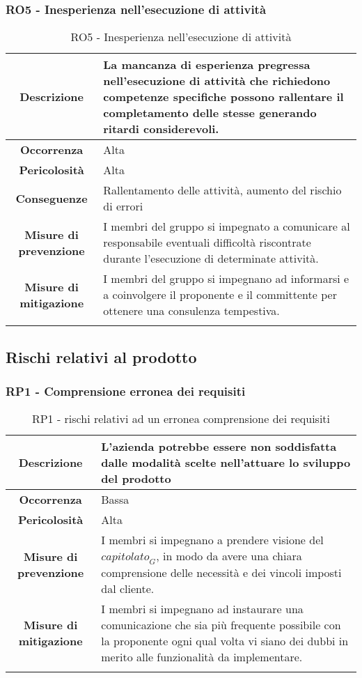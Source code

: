 %
%
\subsubsection[RO5]{RO5 - Inesperienza nell'esecuzione di attività}\label{ro:5}
\begin{longtable}{|c|p{12cm}|}
\hline
\textbf{Descrizione} & La mancanza di esperienza pregressa nell'esecuzione di attività che richiedono competenze specifiche possono rallentare il completamento delle stesse generando ritardi considerevoli. \\
\hline
\textbf{Occorrenza} & Alta \\
\hline
\textbf{Pericolosità} & Alta \\
\hline
\textbf{Conseguenze} & Rallentamento delle attività, aumento del rischio di errori \\
\hline
\textbf{Misure di prevenzione} & I membri del gruppo si impegnato a comunicare al responsabile eventuali difficoltà riscontrate durante l'esecuzione di determinate attività. \\
\hline
\textbf{Misure di mitigazione} &  I membri del gruppo si impegnano ad informarsi e a coinvolgere il proponente e il committente per ottenere una consulenza tempestiva.\\
\hline
\caption{RO5 - Inesperienza nell'esecuzione di attività}
\end{longtable}

\subsection{Rischi relativi al prodotto}
%
%
\subsubsection[RP1]{RP1 - Comprensione erronea dei requisiti}\label{rp:1}
\begin{longtable}{|c|p{12cm}|}
\hline
\textbf{Descrizione} & L'azienda potrebbe essere non soddisfatta dalle modalità scelte nell'attuare lo sviluppo del prodotto\\
\hline
\textbf{Occorrenza} & Bassa \\
\hline
\textbf{Pericolosità} & Alta \\
\hline
\textbf{Misure di prevenzione} & I membri si impegnano a prendere visione del $\textit{capitolato}_G$, in modo da avere una chiara comprensione delle necessità e dei vincoli imposti dal cliente. \\
\hline
\textbf{Misure di mitigazione} &  I membri si impegnano ad instaurare una comunicazione che sia più frequente possibile con la proponente ogni qual volta vi siano dei dubbi in merito alle funzionalità da implementare.\\
\hline
\caption{RP1 - rischi relativi ad un erronea comprensione dei requisiti}
\end{longtable}

